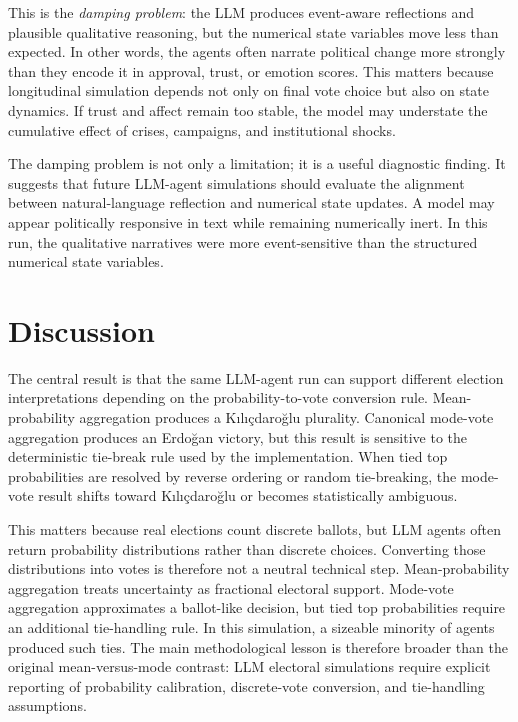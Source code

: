\documentclass[pdflatex,sn-mathphys-num,iicol]{sn-jnl}
\begin{document}
This is the \textit{damping problem}: the LLM produces event-aware reflections and plausible qualitative reasoning, but the numerical state variables move less than expected. In other words, the agents often narrate political change more strongly than they encode it in approval, trust, or emotion scores. This matters because longitudinal simulation depends not only on final vote choice but also on state dynamics. If trust and affect remain too stable, the model may understate the cumulative effect of crises, campaigns, and institutional shocks.

The damping problem is not only a limitation; it is a useful diagnostic finding. It suggests that future LLM-agent simulations should evaluate the alignment between natural-language reflection and numerical state updates. A model may appear politically responsive in text while remaining numerically inert. In this run, the qualitative narratives were more event-sensitive than the structured numerical state variables.

\section{Discussion}\label{sec:discussion}

The central result is that the same LLM-agent run can support different election interpretations depending on the probability-to-vote conversion rule. Mean-probability aggregation produces a Kılıçdaroğlu plurality. Canonical mode-vote aggregation produces an Erdoğan victory, but this result is sensitive to the deterministic tie-break rule used by the implementation. When tied top probabilities are resolved by reverse ordering or random tie-breaking, the mode-vote result shifts toward Kılıçdaroğlu or becomes statistically ambiguous.

This matters because real elections count discrete ballots, but LLM agents often return probability distributions rather than discrete choices. Converting those distributions into votes is therefore not a neutral technical step. Mean-probability aggregation treats uncertainty as fractional electoral support. Mode-vote aggregation approximates a ballot-like decision, but tied top probabilities require an additional tie-handling rule. In this simulation, a sizeable minority of agents produced such ties. The main methodological lesson is therefore broader than the original mean-versus-mode contrast: LLM electoral simulations require explicit reporting of probability calibration, discrete-vote conversion, and tie-handling assumptions.
\end{document}
